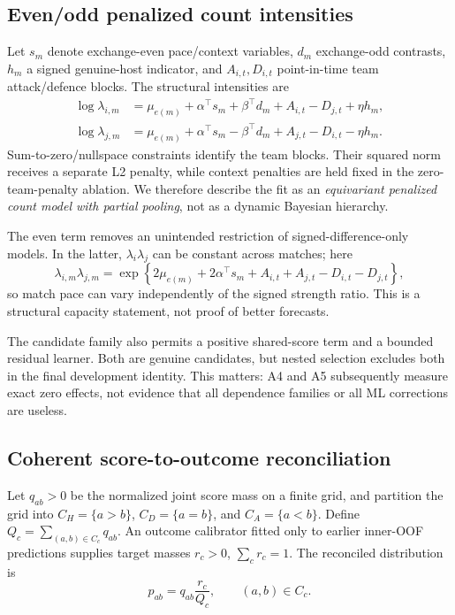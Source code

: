 \documentclass[11pt]{article}
\begin{document}
\subsection{Even/odd penalized count intensities}

Let $s_m$ denote exchange-even pace/context variables, $d_m$ exchange-odd contrasts, $h_m$ a signed
genuine-host indicator, and $A_{i,t},D_{i,t}$ point-in-time team attack/defence blocks.  The
structural intensities are
\begin{align}
 \log\lambda_{i,m} &= \mu_{e(m)}+\alpha^\top s_m+\beta^\top d_m
                      +A_{i,t}-D_{j,t}+\eta h_m, \\
 \log\lambda_{j,m} &= \mu_{e(m)}+\alpha^\top s_m-\beta^\top d_m
                      +A_{j,t}-D_{i,t}-\eta h_m.
\end{align}
Sum-to-zero/nullspace constraints identify the team blocks.  Their squared norm receives a
separate L2 penalty, while context penalties are held fixed in the zero-team-penalty ablation.  We
therefore describe the fit as an \emph{equivariant penalized count model with partial pooling}, not
as a dynamic Bayesian hierarchy.

The even term removes an unintended restriction of signed-difference-only models.  In the latter,
$\lambda_i\lambda_j$ can be constant across matches; here
\begin{equation}
 \lambda_{i,m}\lambda_{j,m}=
 \exp\!\left\{2\mu_{e(m)}+2\alpha^\top s_m+A_{i,t}+A_{j,t}-D_{i,t}-D_{j,t}\right\},
\end{equation}
so match pace can vary independently of the signed strength ratio.  This is a structural capacity
statement, not proof of better forecasts.

The candidate family also permits a positive shared-score term and a bounded residual learner.
Both are genuine candidates, but nested selection excludes both in the final development identity.
This matters: A4 and A5 subsequently measure exact zero effects, not evidence that all dependence
families or all ML corrections are useless.

\subsection{Coherent score-to-outcome reconciliation}

Let $q_{ab}>0$ be the normalized joint score mass on a finite grid, and partition the grid into
$C_H=\{a>b\}$, $C_D=\{a=b\}$, and $C_A=\{a<b\}$.  Define
$Q_c=\sum_{(a,b)\in C_c}q_{ab}$.  An outcome calibrator fitted only to earlier inner-OOF
predictions supplies target masses $r_c>0$, $\sum_c r_c=1$.  The reconciled distribution is
\begin{equation}
 p_{ab}=q_{ab}\frac{r_c}{Q_c},\qquad (a,b)\in C_c.
 \label{eq:projection}
\end{equation}
\end{document}
